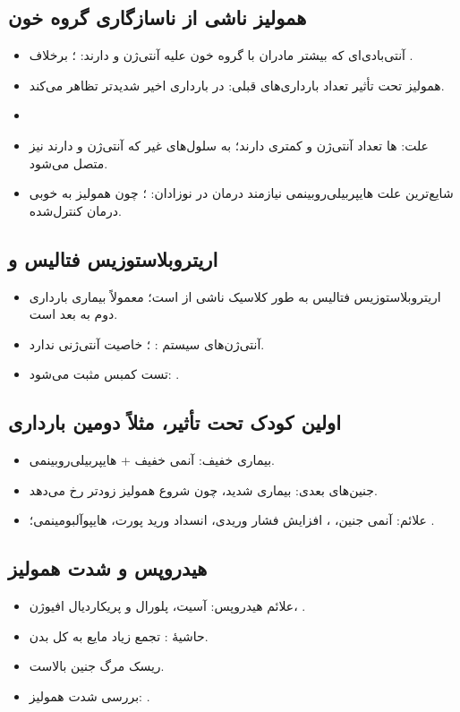 \documentclass[12pt,a4paper]{article}
\begin{document}
\subsection*{همولیز ناشی از ناسازگاری گروه خون}
\begin{itemize}
\item آنتی‌بادی‌ای که بیشتر مادران با گروه خون  علیه آنتی‌ژن  و  دارند:
؛ برخلاف .
\item همولیز  تحت تأثیر تعداد بارداری‌های قبلی: در بارداری اخیر شدیدتر تظاهر می‌کند.
\item {}
\item علت: ها تعداد آنتی‌ژن  و  کمتری دارند؛
 به سلول‌های غیر  که آنتی‌ژن  و  دارند نیز متصل می‌شود.
\item شایع‌ترین علت هایپربیلی‌روبینمی نیازمند درمان در نوزادان:
؛ چون همولیز  به خوبی درمان کنترل‌شده.
\end{itemize}
\subsection*{اریتروبلاستوزیس فتالیس و }
\begin{itemize}
\item اریتروبلاستوزیس فتالیس به طور کلاسیک ناشی از  است؛
معمولاً بیماری بارداری دوم به بعد است.
\item آنتی‌ژن‌های سیستم : ؛
 خاصیت آنتی‌ژنی ندارد.
\item تست کمبس مثبت می‌شود: .
\end{itemize}
\subsection*{اولین کودک تحت تأثیر، مثلاً دومین بارداری}
\begin{itemize}
\item بیماری خفیف: آنمی خفیف + هایپربیلی‌روبینمی.
\item جنین‌های بعدی: بیماری شدید، چون شروع همولیز زودتر رخ می‌دهد.
\item علائم: آنمی جنین، ، افزایش فشار وریدی، انسداد ورید پورت، هایپوآلبومینمی؛
.
\end{itemize}

\subsection*{هیدروپس و شدت همولیز}
\begin{itemize}
\item علائم هیدروپس: آسیت، پلورال و پریکاردیال افیوژن، .
\item حاشیهٔ : تجمع زیاد مایع به کل بدن.
\item ریسک مرگ جنین بالاست.
\item بررسی شدت همولیز: .
\end{itemize}
\end{document}
